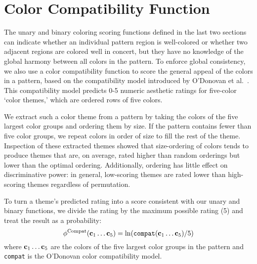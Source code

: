 \section{Color Compatibility Function}
\label{sec:colorCompat}

The unary and binary coloring scoring functions defined in the last two sections can indicate whether an individual pattern region is well-colored or whether two adjacent regions are colored well in concert, but they have no knowledge of the global harmony between all colors in the pattern. To enforce global consistency, we also use a color compatibility function to score the general appeal of the colors in a pattern, based on the compatibility model introduced by O'Donovan et al.~. This compatibility model predicts 0-5 numeric aesthetic ratings for five-color `color themes,' which are ordered rows of five colors. 

We extract such a color theme from a pattern by taking the colors of the five largest color groups and ordering them by size. If the pattern contains fewer than five color groups, we repeat colors in order of size to fill the rest of the theme. Inspection of these extracted themes showed that size-ordering of colors tends to produce themes that are, on average, rated higher than random orderings but lower than the optimal ordering. Additionally, ordering has little effect on discriminative power: in general, low-scoring themes are rated lower than high-scoring themes regardless of permutation.

To turn a theme's predicted rating into a score consistent with our unary and binary functions, we divide the rating by the maximum possible rating (5) and treat the result as a probability:
\begin{equation*}
\phi^{\textrm{Compat}}(\mathbf{c}_1 \ldots \mathbf{c}_5) = \ln(\texttt{compat}(\mathbf{c}_1 \ldots \mathbf{c}_5) / 5)
\end{equation*}
where $\mathbf{c}_1 \ldots \mathbf{c}_5$ are the colors of the five largest color groups in the pattern and \texttt{compat} is the O'Donovan color compatibility model.

